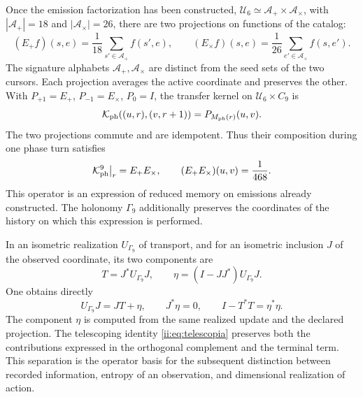 Once the emission factorization has been constructed,
\(\mathcal U_6\simeq\mathcal A_+\times\mathcal A_\times\), with
\(|\mathcal A_+|=18\) and \(|\mathcal A_\times|=26\), there are
two projections on functions of the catalog:
\[
 (E_+f)(s,e)=\frac1{18}\sum_{s'\in\mathcal A_+}f(s',e),\qquad
 (E_\times f)(s,e)=\frac1{26}\sum_{e'\in\mathcal A_\times}f(s,e').
\]
The signature alphabets \(\mathcal A_+,\mathcal A_\times\) are
distinct from the seed sets of the two cursors.
Each projection averages the active coordinate and preserves the other. With
\(P_{+1}=E_+\), \(P_{-1}=E_\times\), \(P_0=I\), the transfer
kernel on \(\mathcal U_6\times C_9\) is
\[
 \mathcal K_{\rm ph}((u,r),(v,r+1))=P_{M_{\rm ph}(r)}(u,v).
\]
The two projections commute and are idempotent. Thus their composition
during one phase turn satisfies
\begin{equation}
 \mathcal K_{\rm ph}^{9}\big|_r=E_+E_\times,\qquad
 (E_+E_\times)(u,v)=\frac1{468}.
 \label{ii:ii:tpk-renovacion}
\end{equation}
This operator is an expression of reduced memory on emissions already constructed. The holonomy \(\Gamma_9\) additionally preserves the coordinates of the history on which this expression is performed.

In an isometric realization \(U_{\Gamma_9}\) of transport, and for
an isometric inclusion \(J\) of the observed coordinate, its two
components are
\[
 T=J^*U_{\Gamma_9}J,\qquad
 \eta=(I-JJ^*)U_{\Gamma_9}J.
\]
One obtains directly
\[
 U_{\Gamma_9}J=JT+\eta,\qquad J^*\eta=0,\qquad
 I-T^*T=\eta^*\eta.
\]
The component \(\eta\) is computed from the same realized update
and the declared projection. The telescoping identity
\eqref{ii:eq:telescopia} preserves both the contributions expressed in the
orthogonal complement and the terminal term. This separation is the
operator basis for the subsequent distinction between recorded information,
entropy of an observation, and dimensional realization of action.

